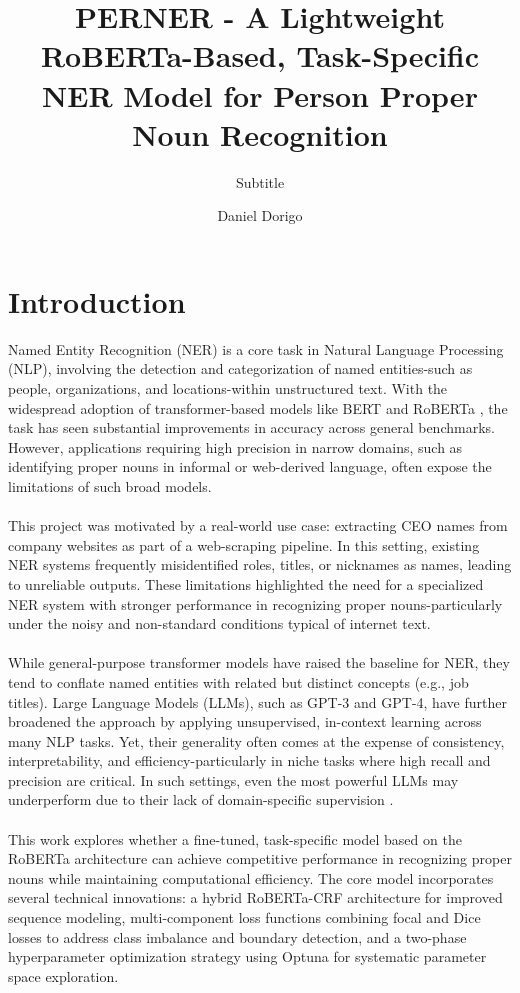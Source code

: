 \documentclass[a4paper]{usiinfbachelorproject}
\author{Daniel Dorigo }
\title{\textbf{PERNER - A Lightweight RoBERTa-Based, Task-Specific NER Model for Person Proper Noun Recognition}}
\subtitle{Subtitle}
\begin{document}
\maketitle
\tableofcontents
\newpage

\section{\textbf{Introduction}}
Named Entity Recognition (NER) is a core task in Natural Language Processing (NLP), involving the detection and categorization of named entities-such as people, organizations, and locations-within unstructured text. With the widespread adoption of transformer-based models like BERT \cite{devlin-etal-2019-bert} and RoBERTa \cite{liu2019roberta}, the task has seen substantial improvements in accuracy across general benchmarks. However, applications requiring high precision in narrow domains, such as identifying proper nouns in informal or web-derived language, often expose the limitations of such broad models.
\\ \\
This project was motivated by a real-world use case: extracting CEO names from company websites as part of a web-scraping pipeline. In this setting, existing NER systems frequently misidentified roles, titles, or nicknames as names, leading to unreliable outputs. These limitations highlighted the need for a specialized NER system with stronger performance in recognizing proper nouns-particularly under the noisy and non-standard conditions typical of internet text.
\\ \\
While general-purpose transformer models have raised the baseline for NER, they tend to conflate named entities with related but distinct concepts (e.g., job titles). Large Language Models (LLMs), such as GPT-3\cite{brown2020languagemodelsfewshotlearners} and GPT-4, have further broadened the approach by applying unsupervised, in-context learning across many NLP tasks. Yet, their generality often comes at the expense of consistency, interpretability, and efficiency-particularly in niche tasks where high recall and precision are critical. In such settings, even the most powerful LLMs may underperform due to their lack of domain-specific supervision \cite{DBLP:journals/corr/abs-2304-10428}.
\\ \\ 
This work explores whether a fine-tuned, task-specific model based on the RoBERTa architecture can achieve competitive performance in recognizing proper nouns while maintaining computational efficiency. The core model incorporates several technical innovations: a hybrid RoBERTa-CRF architecture for improved sequence modeling, multi-component loss functions combining focal and Dice losses to address class imbalance and boundary detection, and a two-phase hyperparameter optimization strategy using Optuna for systematic parameter space exploration.
\end{document}
